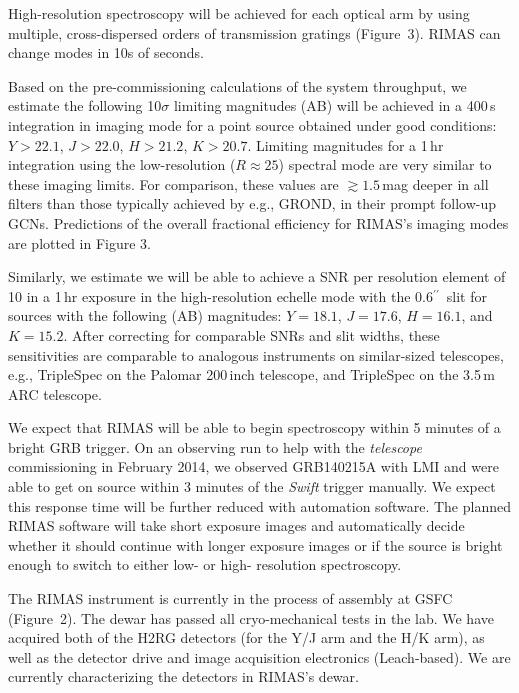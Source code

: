 \documentclass[letterpaper,11pt]{article}
\newcommand{\arcsec}{\mbox{$^{\prime\prime}$}}%
\begin{document}
High-resolution spectroscopy will be achieved for each optical arm by using 
multiple, cross-dispersed orders of transmission gratings (Figure~3).  RIMAS
can change modes in 10s of seconds.

\smallskip

Based on the pre-commissioning calculations of the system throughput, we estimate 
the following 10$\sigma$ limiting magnitudes (AB) will be achieved in a 400\,s
integration in imaging mode for a point source obtained under good 
conditions: $Y > 22.1$, $J > 22.0$, $H > 21.2$, $K > 20.7$.  Limiting
magnitudes for a 1\,hr integration using the low-resolution ($R \approx 25$)
spectral mode are very similar to these imaging limits.  For comparison, 
these values are $\gtrsim 1.5$\,mag deeper in all filters than those typically 
achieved by e.g., GROND, in their prompt follow-up GCNs. Predictions of the overall
fractional efficiency for RIMAS's imaging modes are plotted in Figure 3.

Similarly, we estimate we will be able to achieve a SNR per resolution element of 
10 in a 1\,hr exposure in the high-resolution echelle mode with the 0.6\arcsec\ 
slit for sources with the following (AB) magnitudes: $Y = 18.1$, $J = 17.6$, 
$H = 16.1$, and $K = 15.2$.  After correcting for comparable SNRs and slit
widths, these sensitivities are comparable to analogous instruments on 
similar-sized telescopes, e.g., TripleSpec on the Palomar 200\,inch telescope, and
TripleSpec on the 3.5\,m ARC telescope.

We expect that RIMAS will be able to begin spectroscopy within 5 minutes of a 
bright GRB trigger.  On an observing run to help with the \textit{telescope} 
commissioning in February 2014, we observed GRB140215A with LMI and were able to 
get on source within 3 minutes of the \textit{Swift} trigger manually.  We expect this 
response time will be further reduced with automation software.  The planned RIMAS  
software will take short exposure images and automatically decide whether it should
continue with longer exposure images or if the source is bright enough to switch 
to either low- or high- resolution spectroscopy.

\smallskip

The RIMAS instrument is currently in the process of assembly at GSFC (Figure~2).
The dewar has passed all cryo-mechanical tests in the lab.  We have acquired both of the H2RG detectors (for the Y/J 
arm and the H/K arm), as well as the detector drive and image acquisition electronics
(Leach-based).  We are currently characterizing the detectors in RIMAS's dewar.
\end{document}
